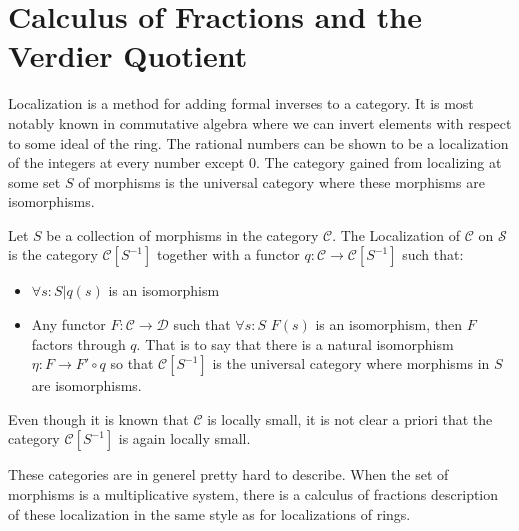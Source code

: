 \section{Calculus of Fractions and the Verdier Quotient}
     Localization is a method for adding formal inverses to a category. It is most notably known in commutative algebra where we can invert elements with respect to some ideal of the ring. The rational numbers can be shown to be a localization of the integers at every number except 0. The category gained from localizing at some set $S$ of morphisms is the universal category where these morphisms are isomorphisms.
    \begin{definition}
        Let $S$ be a collection of morphisms in the category $\mathcal{C}$. The Localization of $\mathcal{C}$ on $\mathcal{S}$ is the category $\mathcal{C}[S^{-1}]$ together with a functor $q:\mathcal{C}\rightarrow \mathcal{C}[S^{-1}]$ such that:
        \begin{itemize}
            \item $\forall s:S|q(s)$ is an isomorphism
            \item Any functor $F:\mathcal{C}\rightarrow\mathcal{D}$ such that $\forall s:S$ $F(s)$ is an isomorphism, then $F$ factors through $q$. That is to say that there is a natural isomorphism $\eta : F\rightarrow F'\circ q$ so that $\mathcal{C}[S^{-1}]$ is the universal category where morphisms in $S$ are isomorphisms.
        \end{itemize}
        \begin{center}
        \end{center}
    \end{definition}

    \begin{remark}
        Even though it is known that $\mathcal{C}$ is locally small, it is not clear a priori that the category $\mathcal{C}[S^{-1}]$ is again locally small.
    \end{remark}

     These categories are in generel pretty hard to describe. When the set of morphisms is a multiplicative system, there is a calculus of fractions description of these localization in the same style as for localizations of rings.

